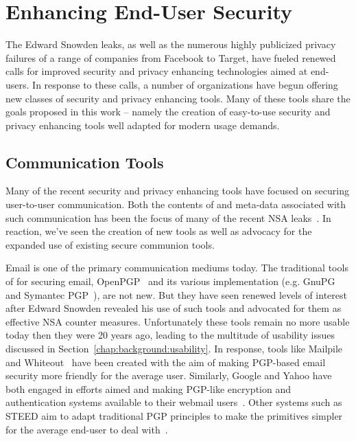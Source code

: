 \section{Enhancing End-User Security}
\label{chap:related:enduser}

The Edward Snowden leaks, as well as the numerous highly publicized
privacy failures of a range of companies from Facebook to Target, have
fueled renewed calls for improved security and privacy enhancing
technologies aimed at end-users. In response to these calls, a number
of organizations have begun offering new classes of security and privacy
enhancing tools. Many of these tools share the goals proposed in this
work -- namely the creation of easy-to-use security and privacy enhancing
tools well adapted for modern usage demands.

\subsection{Communication Tools}

Many of the recent security and privacy enhancing tools have focused
on securing user-to-user communication. Both the contents of and
meta-data associated with such communication has been the focus of
many of the recent NSA leaks~\cite{schneier-metadata}. In reaction,
we've seen the creation of new tools as well as advocacy for the
expanded use of existing secure communion tools.

Email is one of the primary communication mediums today. The
traditional tools of for securing email, OpenPGP~\cite{openpgp} and
its various implementation (e.g. GnuPG~\cite{gnupg} and Symantec
PGP~\cite{pgp}), are not new. But they have seen renewed levels of
interest after Edward Snowden revealed his use of such tools and
advocated for them as effective NSA counter measures. Unfortunately
these tools remain no more usable today then they were 20 years ago,
leading to the multitude of usability issues discussed in
Section~\ref{chap:background:usability}. In response, tools like
Mailpile~\cite{mailpile} and Whiteout~\cite{whiteout} have been
created with the aim of making PGP-based email security more friendly
for the average user. Similarly, Google and Yahoo have both engaged in
efforts aimed and making PGP-like encryption and authentication
systems available to their webmail users~\cite{google-endtoend,
  yahoo-endtoend}. Other systems such as STEED aim to adapt
traditional PGP principles to make the primitives simpler for the
average end-user to deal with~\cite{koch2011}.

